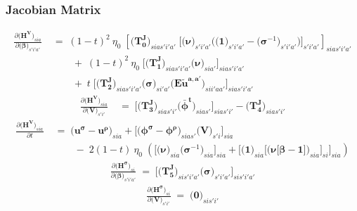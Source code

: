 \documentclass[11pt,fleqn]{article}
\newcommand{\bsigma}{\bm{\sigma}}
\newcommand{\bbeta}{\bm{\beta}}
\newcommand{\bV}{\bm{V}}
\newcommand{\bnu}{\bm{\nu}}
\newcommand{\bzero}{\bm{0}}
\newcommand{\bone}{\bm{1}}
\newcommand{\tu}{\tilde{u}}
\begin{document}
\subsubsection*{Jacobian Matrix} 

\begin{align*}
	\frac{ \partial \biggl( \bm{H^{V}} \biggr)_{sia} }{ \partial \biggl( \bbeta \biggr)_{s'i'a'} } & \;=\; 
	(1-t)^2 \: \eta_0 \; \left[ \biggl( \bm{T_0^J} \biggr)_{sias'i'a'} \; \Biggl[ \biggl( \bnu \biggr)_{s'i'a'} \Biggl( \biggl( \bone \biggr)_{s'i'a'} - \biggl( \bsigma^{-1} \biggr)_{s'i'a'} \Biggr) \Biggr]_{s'i'a'} \right]_{sias'i'a'} \\
	& \qquad \;+\;  (1-t)^2 \: \eta_0 \; \Biggl[ \biggl( \bm{T_1^J} \biggr)_{sias'i'a'} \biggl( \bnu \biggr)_{sia'} \Biggr]_{sias'i'a'} \\
	& \qquad \;+\; t \; \Biggl[ \biggl( \bm{T_2^J} \biggr)_{sias'i'a'} \biggl( \bsigma \biggr)_{si'a'} \biggl( \bm{{E\tu^{a,a'}}} \biggr)_{sii'aa'} \Biggr]_{sias'i'a'}
\end{align*}
\begin{align*}
	\frac{ \partial \biggl( \bm{H^{V}} \biggr)_{sia} }{ \partial \biggl( \bV \biggr)_{s'i'} } & \;=\; 
	\Biggl[ \biggl( \bm{T_3^J} \biggr)_{sias'i'} \biggl( \bm{{\bar{\phi}^t}} \biggr)_{sias'} \Biggr]_{sias'i'} - \biggl( \bm{T_4^J} \biggr)_{sias'i'}
\end{align*}
\begin{align*}
	\frac{ \partial \biggl( \bm{H^{V}} \biggr)_{sia} }{ \partial t } & \;=\; 
	\biggl( \bm{u^{\sigma}} - \bm{u^{\rho}} \biggr)_{sia} + \Biggl[ \biggl( \bm{\phi^{\sigma}} - \bm{\phi^{\rho}} \biggr)_{sias'} \biggl( \bV \biggr)_{s'i} \Biggr]_{sia} \\
	& \qquad \;-\; 2(1-t) \: \eta_0 \; \left( \Biggl[ \biggl( \bnu \biggr)_{sia} \biggl( \bsigma^{-1} \biggr)_{sia} \Biggr]_{sia} + \Biggl[ \biggl( \bone \biggr)_{sia} \Biggl[ \biggl( \bnu\bigl[\bbeta-\bone\bigr] \biggr)_{sia} \Biggr]_{si} \Biggr]_{sia} \right)
\end{align*}
\begin{align*}
	\frac{ \partial \biggl( \bm{H^{\sigma}} \biggr)_{si} }{ \partial \biggl( \bbeta \biggr)_{s'i'a'} } \;=\; 
	\Biggl[ \biggl( \bm{T_5^J} \biggr)_{sis'i'a'} \biggl( \bsigma \biggr)_{s'i'a'} \Biggr]_{sis'i'a'}
\end{align*}
\begin{align*}
	\frac{ \partial \biggl( \bm{H^{\sigma}} \biggr)_{si} }{ \partial \biggl( \bV \biggr)_{s'i'} } \;=\; \biggl( \bzero \biggr)_{sis'i'}
\end{align*}
\end{document}
